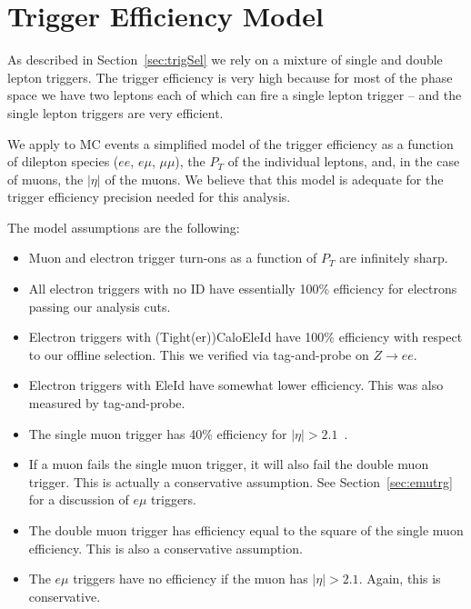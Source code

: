 \setcounter{table}{0}
\renewcommand\thetable{\Alph{section}.\arabic{table}}
\setcounter{figure}{0}
\renewcommand\thefigure{\Alph{section}.\arabic{figure}}
\section{Trigger Efficiency Model}
\label{sec:appendix_trigger}

As described in Section~\ref{sec:trigSel} we rely on a
mixture of single and double lepton triggers.  The trigger
efficiency is very high because for most of the phase space 
we have two leptons each of which can fire a single lepton 
trigger -- and the single lepton triggers are very efficient.

We apply to MC events a simplified model of the trigger efficiency 
as a function of dilepton species ($ee$, $e\mu$, $\mu\mu$), the $P_T$ 
of the individual leptons, and, in the case of muons, the $|\eta|$
of the muons.  We believe that this model is adequate for
the trigger efficiency precision needed for this analysis.

The model assumptions are the following:

\begin{itemize}

\item Muon and electron trigger turn-ons as a function of $P_T$
are infinitely sharp. %

\item All electron triggers with no ID have essentially 100\%
efficiency for electrons passing our analysis cuts\cite{ref:evans}.

\item Electron triggers with (Tight(er))CaloEleId have 100\%
efficiency with respect to our offline selection.  This we 
verified via tag-and-probe on $Z\to ee$.

\item Electron triggers with EleId have somewhat lower
efficiency.  This was also measured by tag-and-probe.

\item The single muon trigger has 40\% efficiency for 
$|\eta|>2.1$~\cite{ref:evans}.

\item If a muon fails the single muon trigger, it
will also fail the double muon trigger.  This is actually 
a conservative assumption.  See Section~\ref{sec:emutrg}
for a discussion of $e\mu$ triggers.

\item The double muon trigger has efficiency
equal to the square of the single muon efficiency.  This is
also a conservative assumption.

\item The $e\mu$ triggers have no efficiency if the muon has $|\eta|>2.1$.
Again, this is conservative.
\end{itemize}

